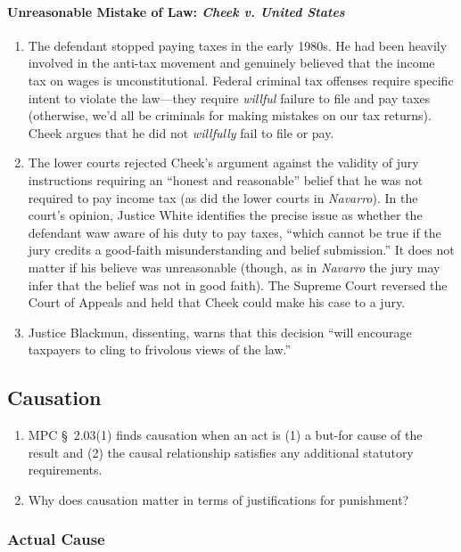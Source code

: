 \paragraph{Unreasonable Mistake of Law: \emph{Cheek v. United States}}

\begin{enumerate}
    \item The defendant stopped paying taxes in the early 1980s. He had been heavily involved in the anti-tax movement and genuinely believed that the income tax on wages is unconstitutional. Federal criminal tax offenses require specific intent to violate the law---they require \emph{willful} failure to file and pay taxes (otherwise, we'd all be criminals for making mistakes on our tax returns). Cheek argues that he did not \emph{willfully} fail to file or pay.
    \item The lower courts rejected Cheek's argument against the validity of jury instructions requiring an ``honest and reasonable'' belief that he was not required to pay income tax (as did the lower courts in \emph{Navarro}). In the court's opinion, Justice White identifies the precise issue as whether the defendant waw aware of his duty to pay taxes, ``which cannot be true if the jury credits a good-faith misunderstanding and belief submission.'' It does not matter if his believe was unreasonable (though, as in \emph{Navarro} the jury may infer that the belief was not in good faith). The Supreme Court reversed the Court of Appeals and held that Cheek could make his case to a jury.
    \item Justice Blackmun, dissenting, warns that this decision ``will encourage taxpayers to cling to frivolous views of the law.''
\end{enumerate}

\subsection{Causation}

\begin{enumerate}
    \item MPC § 2.03(1) finds causation when an act is (1) a but-for cause of the result and (2) the causal relationship satisfies any additional statutory requirements.%
    \item Why does causation matter in terms of justifications for punishment?
\end{enumerate}

\subsubsection{Actual Cause}

